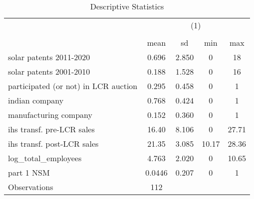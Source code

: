\begin{table}[htbp]\centering
\def\sym#1{\ifmmode^{#1}\else\(^{#1}\)\fi}
\caption{Descriptive Statistics \label{table1}}
\begin{tabular}{l*{1}{cccc}}
\hline\hline
                    &\multicolumn{4}{c}{(1)}                            \\
                    &\multicolumn{4}{c}{}                               \\
                    &        mean&          sd&         min&         max\\
\hline
solar patents 2011-2020&       0.696&       2.850&           0&          18\\
solar patents 2001-2010&       0.188&       1.528&           0&          16\\
participated (or not) in LCR auction&       0.295&       0.458&           0&           1\\
indian company      &       0.768&       0.424&           0&           1\\
manufacturing company&       0.152&       0.360&           0&           1\\
ihs transf. pre-LCR sales&       16.40&       8.106&           0&       27.71\\
ihs transf. post-LCR sales&       21.35&       3.085&       10.17&       28.36\\
log\_total\_employees &       4.763&       2.020&           0&       10.65\\
part 1 NSM          &      0.0446&       0.207&           0&           1\\
\hline
Observations        &         112&            &            &            \\
\hline\hline
\end{tabular}
\end{table}
